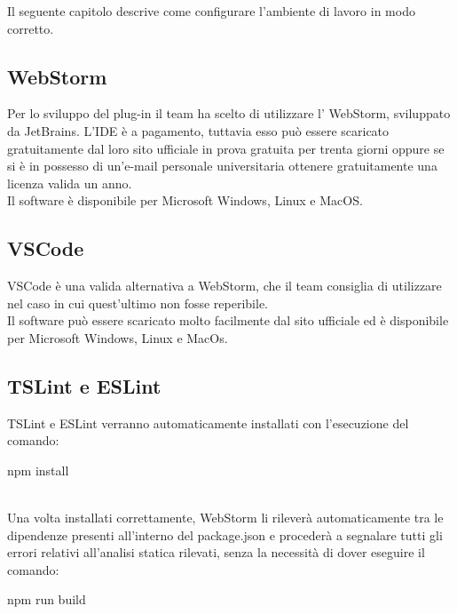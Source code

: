 Il seguente capitolo descrive come configurare l'ambiente di lavoro in modo corretto.

\subsection{WebStorm}
Per lo sviluppo del plug-in il team ha scelto di utilizzare l' WebStorm, sviluppato da JetBrains. L'IDE è a pagamento, tuttavia esso può essere scaricato gratuitamente dal loro sito ufficiale in prova gratuita per trenta giorni oppure se si è in possesso di un'e-mail personale universitaria ottenere gratuitamente una licenza valida un anno.\\
Il software è disponibile per Microsoft Windows, Linux e MacOS.
\subsection{VSCode}
VSCode è una valida alternativa a WebStorm, che il team consiglia di utilizzare nel caso in cui quest'ultimo non fosse reperibile.\\
Il software può essere scaricato molto facilmente dal sito ufficiale ed è disponibile per Microsoft Windows, Linux e MacOs.
\subsection{TSLint e ESLint}
TSLint e ESLint verranno automaticamente installati con l'esecuzione del comando:\\[0.2cm]
\hspace*{10mm}
\begin{ttfamily}
	npm install
\end{ttfamily}\\[0.2cm]
Una volta installati correttamente, WebStorm li rileverà automaticamente tra le dipendenze presenti all'interno del package.json e procederà a segnalare tutti gli errori relativi all'analisi statica rilevati, senza la necessità di dover eseguire il comando:
\\[0.2cm]
\hspace*{10mm}
\begin{ttfamily}
npm run build
\end{ttfamily}
\\[0.2cm]

\pagebreak